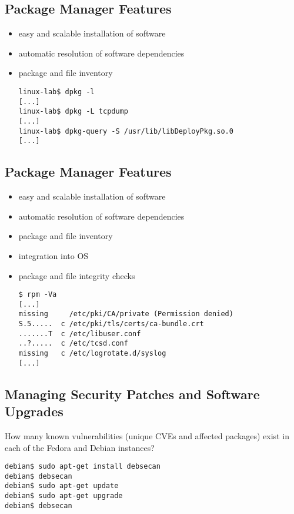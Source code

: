 \documentclass[xga]{xdvislides}
\begin{document}
\subsection{Package Manager Features}
\begin{itemize}
	\item easy and scalable installation of software
	\item automatic resolution of software dependencies
	\item package and file inventory \\
\begin{verbatim}
linux-lab$ dpkg -l
[...]
linux-lab$ dpkg -L tcpdump
[...]
linux-lab$ dpkg-query -S /usr/lib/libDeployPkg.so.0
[...]

\end{verbatim}
\end{itemize}

\subsection{Package Manager Features}
\begin{itemize}
	\item easy and scalable installation of software
	\item automatic resolution of software dependencies
	\item package and file inventory
	\item integration into OS
	\item package and file integrity checks \\
\begin{verbatim}
$ rpm -Va
[...]
missing     /etc/pki/CA/private (Permission denied)
S.5.....  c /etc/pki/tls/certs/ca-bundle.crt
.......T  c /etc/libuser.conf
..?.....  c /etc/tcsd.conf
missing   c /etc/logrotate.d/syslog
[...]
\end{verbatim}
\end{itemize}

\subsection{Managing Security Patches and Software Upgrades}
How many known vulnerabilities (unique CVEs and affected packages) exist
in each of the Fedora and Debian instances?

\begin{verbatim}
debian$ sudo apt-get install debsecan
debian$ debsecan
debian$ sudo apt-get update
debian$ sudo apt-get upgrade
debian$ debsecan
\end{verbatim}
\end{document}

